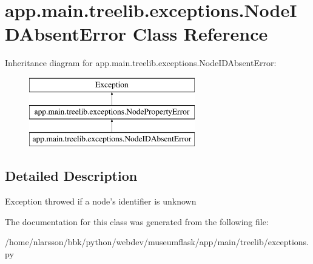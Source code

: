 \hypertarget{classapp_1_1main_1_1treelib_1_1exceptions_1_1NodeIDAbsentError}{}\section{app.\+main.\+treelib.\+exceptions.\+Node\+I\+D\+Absent\+Error Class Reference}
\label{classapp_1_1main_1_1treelib_1_1exceptions_1_1NodeIDAbsentError}
Inheritance diagram for app.\+main.\+treelib.\+exceptions.\+Node\+I\+D\+Absent\+Error\+:\begin{figure}[H]
\begin{center}
\leavevmode
\includegraphics[height=3.000000cm]{classapp_1_1main_1_1treelib_1_1exceptions_1_1NodeIDAbsentError}
\end{center}
\end{figure}


\subsection{Detailed Description}
\begin{DoxyVerb}Exception throwed if a node's identifier is unknown\end{DoxyVerb}
 

The documentation for this class was generated from the following file\+:\begin{DoxyCompactItemize}
\item 
/home/nlarsson/bbk/python/webdev/museumflask/app/main/treelib/exceptions.\+py\end{DoxyCompactItemize}
